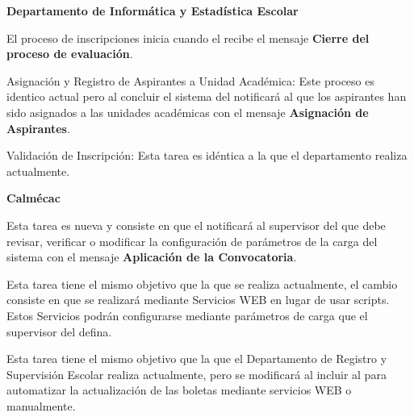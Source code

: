 \begin{PDescripcion}
	
	\Ppaso \textbf{Departamento de Informática y Estadística Escolar}
	
	\begin{enumerate}
		 \Ppaso[\Einicio]  El proceso de inscripciones inicia cuando el  recibe el mensaje \textbf{Cierre del proceso de evaluación}.
		 
		 \Ppaso [\PSubProceso] Asignación y Registro de Aspirantes a Unidad Académica: Este proceso es identico actual pero al concluir el  sistema del  notificará al  que los aspirantes han sido asignados a las unidades académicas con el mensaje \textbf{Asignación de Aspirantes}.
		 
		 \Ppaso [\PSubProceso] Validación de Inscripción: Esta tarea es idéntica a la que el departamento realiza actualmente.
		  
	\end{enumerate}
	
	
	\Ppaso \textbf{Calmécac}
	
	\begin{enumerate}
		\Ppaso[\itarea]  Esta tarea es nueva y consiste en que el  notificará al supervisor del  que debe revisar, verificar o modificar la configuración de parámetros de la carga del sistema con el mensaje \textbf{Aplicación de la Convocatoria}. %
		
		\Ppaso [\PSubProceso] Esta tarea tiene el mismo objetivo que la que se realiza actualmente, el cambio consiste en que se realizará mediante Servicios WEB en lugar de usar scripts. Estos Servicios podrán configurarse mediante parámetros de carga que el supervisor del  defina.
		
		\Ppaso [\PSubProceso]  Esta tarea tiene el mismo objetivo que la que el Departamento de Registro y Supervisión Escolar  realiza actualmente, pero se modificará al incluir al  para automatizar la actualización de las boletas mediante servicios WEB o manualmente.
	\end{enumerate}


\end{PDescripcion}
